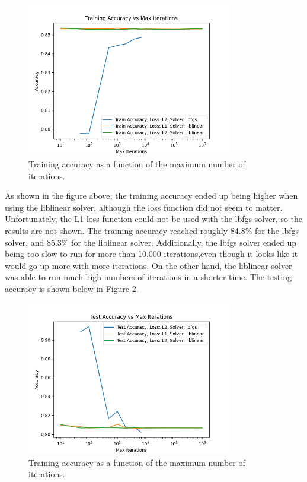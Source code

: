 \documentclass[12pt]{article}
\begin{document}
\begin{figure}[H]
\centering
\includegraphics[width=0.8\textwidth]{train_accuracy.png} %
\caption{Training accuracy as a function of the maximum number of iterations.}
\label{fig:results}
\end{figure}

As shown in the figure above, the training accuracy ended up being higher when
using the liblinear solver, although the loss function did not seem to matter. 
Unfortunately, the L1 loss function could not be used with the lbfgs solver,
so the results are not shown. The training accuracy reached roughly 84.8\% for 
the lbfgs solver, and 85.3\% for the liblinear solver. Additionally, the lbfgs solver
ended up being too slow to run for more than 
10,000 iterations,even though it looks like it would go up more with more iterations. 
On the other hand, the liblinear solver was able to run much high numbers of iterations
in a shorter time. The testing accuracy is shown 
below in Figure \ref{fig:results2}.

\begin{figure}[H]
\centering
\includegraphics[width=0.8\textwidth]{test_accuracy.png} %
\caption{Training accuracy as a function of the maximum number of iterations.}
\label{fig:results2}
\end{figure}
    
\end{document}
